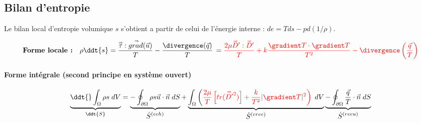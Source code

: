 \subsection{Bilan d'entropie}

Le bilan local d'entropie volumique $s$ s'obtient a partir de celui de l'énergie interne : $de = Tds - p d (1/\rho)$.




\begin{equation}
\mbox{\bf Forme locale :}  \quad
		\rho \ddt{s} 
		=
		\frac{\mytensor{\tau} : \mytensor{grad}(\vec{u})}{T}
		 - \frac{\divergence(\vec{q})}{T}
		 \, = 
		 \color{red}{\frac{2 \mu  \mytensor{D}' : \mytensor{D}'}{T}}  %
  		 +  k \frac{\gradient T \cdot  \gradient T  }{T^2}
		 - \divergence \left( \frac{\vec{q}}{T} \right)
		\label{eq:bilan_local_lagrangien_qdm}
\end{equation}

\paragraph{Forme intégrale (second principe en système ouvert)}
\begin{equation}
		\underbrace{\ddt{} \int_{\Omega} \rho s \; dV
		}_{\ddt{S} }		 
		= \underbrace{  - \oint_{\partial \Omega}  \rho s \vec{u} \cdot \vec{n} \; dS
		}_{\displaystyle \dot{S}^{(ech)}}
		+ 
		\underbrace{ \int_{\Omega} \left(  
		\color{red}{\frac{2\mu}{T}  \left[ tr (\mytensor{D'}^2) %
		\right]}
		 +  \frac{k}{T^2} | \gradient T |^2 
		\right)   \; dV 
		}_{\displaystyle \dot{S}^{(cree)}} 
		 \underbrace{ - \oint_{\partial \Omega} \frac{\vec{q}}{T} \cdot \vec{n} \; dS
		}_{\displaystyle \dot{S}^{(recu)}} 
		\label{eq:bilan_global_eulerien_s}
\end{equation}









